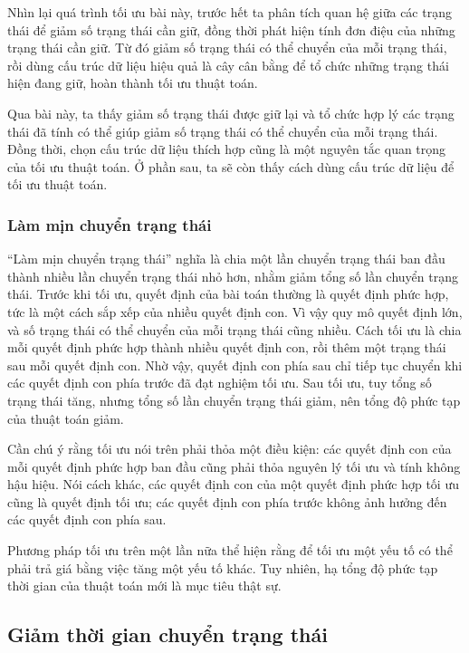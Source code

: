 \documentclass[11pt]{article}
\begin{document}
Nhìn lại quá trình tối ưu bài này, trước hết ta phân tích quan hệ giữa các
trạng thái để giảm số trạng thái cần giữ, đồng thời phát hiện tính đơn điệu
của những trạng thái cần giữ. Từ đó giảm số trạng thái có thể chuyển của mỗi
trạng thái, rồi dùng cấu trúc dữ liệu hiệu quả là cây cân bằng để tổ chức
những trạng thái hiện đang giữ, hoàn thành tối ưu thuật toán.

Qua bài này, ta thấy giảm số trạng thái được giữ lại và tổ chức hợp lý các
trạng thái đã tính có thể giúp giảm số trạng thái có thể chuyển của mỗi trạng
thái. Đồng thời, chọn cấu trúc dữ liệu thích hợp cũng là một nguyên tắc quan
trọng của tối ưu thuật toán. Ở phần sau, ta sẽ còn thấy cách dùng cấu trúc dữ
liệu để tối ưu thuật toán.

\subsubsection{Làm mịn chuyển trạng thái}

``Làm mịn chuyển trạng thái'' nghĩa là chia một lần chuyển trạng thái ban đầu
thành nhiều lần chuyển trạng thái nhỏ hơn, nhằm giảm tổng số lần chuyển trạng
thái. Trước khi tối ưu, quyết định của bài toán thường là quyết định phức hợp,
tức là một cách sắp xếp của nhiều quyết định con. Vì vậy quy mô quyết định
lớn, và số trạng thái có thể chuyển của mỗi trạng thái cũng nhiều. Cách tối
ưu là chia mỗi quyết định phức hợp thành nhiều quyết định con, rồi thêm một
trạng thái sau mỗi quyết định con. Nhờ vậy, quyết định con phía sau chỉ tiếp
tục chuyển khi các quyết định con phía trước đã đạt nghiệm tối ưu. Sau tối
ưu, tuy tổng số trạng thái tăng, nhưng tổng số lần chuyển trạng thái giảm, nên
tổng độ phức tạp của thuật toán giảm.

Cần chú ý rằng tối ưu nói trên phải thỏa một điều kiện: các quyết định con
của mỗi quyết định phức hợp ban đầu cũng phải thỏa nguyên lý tối ưu và tính
không hậu hiệu. Nói cách khác, các quyết định con của một quyết định phức hợp
tối ưu cũng là quyết định tối ưu; các quyết định con phía trước không ảnh
hưởng đến các quyết định con phía sau.

Phương pháp tối ưu trên một lần nữa thể hiện rằng để tối ưu một yếu tố có thể
phải trả giá bằng việc tăng một yếu tố khác. Tuy nhiên, hạ tổng độ phức tạp
thời gian của thuật toán mới là mục tiêu thật sự.

\subsection{Giảm thời gian chuyển trạng thái}
\end{document}
